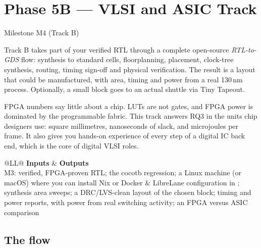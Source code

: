\chapter{Phase 5B --- VLSI and ASIC Track}\label{ch:asic}

 \quad Milestone M4 (Track B)

Track B takes part of your verified RTL through a complete open-source
\emph{RTL-to-GDS} flow: synthesis to standard cells, floorplanning, placement,
clock-tree synthesis, routing, timing sign-off and physical verification. The
result is a layout that could be manufactured, with area, timing and power from
a real 130\,nm process. Optionally, a small block goes to an actual shuttle via
Tiny Tapeout.

\begin{whybox}
FPGA numbers say little about a chip. LUTs are not gates, and FPGA power is
dominated by the programmable fabric. This track answers RQ3 in the units chip
designers use: square millimetres, nanoseconds of slack, and microjoules per
frame. It also gives you hands-on experience of every step of a digital IC
back end, which is the core of digital VLSI roles.
\end{whybox}

\begin{center}\small
\begin{tabularx}{\textwidth}{@{}LL@{}}
\toprule
\textbf{Inputs} & \textbf{Outputs} \\
\midrule
M3: verified, FPGA-proven RTL; the cocotb regression; a Linux machine (or
macOS) where you can install Nix or Docker
& LibreLane configuration in ; synthesis area sweeps; a
DRC/LVS-clean layout of the chosen block; timing and power reports, with power
from real switching activity; an FPGA versus ASIC comparison \\
\bottomrule
\end{tabularx}
\end{center}

\section{The flow}\label{sec:asic:flow}

